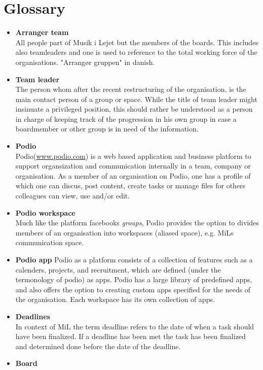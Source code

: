 \section{Glossary}
\begin{itemize}
	\item \textbf{Arranger team}\\
	All people part of Musik i Lejet but the members of the boards. This includes also teamleaders and one is used to reference to the total working force of the organisations. "Arrangør gruppen" in danish.
	\item \textbf{Team leader}\\
	The person whom after the recent restructuring of the organisation, is the main contact person of a group or space. While the title of team leader might insinuate a privileged position, this should rather be understood as a person in charge of keeping track of the progression in his own group in case a boardmember or other group is in need of the information.
	\item \textbf{Podio}\\
	Podio(\href{www.podio.com}{www.podio.com}) is a web based application and business platform to support organsization and communication internally in a team, company or organisation. As a member of an organisation on Podio, one has a profile of which one can discus, post content, create tasks or manage files for others colleagues can view, use and/or edit.
	\item \textbf{Podio workspace} \\
	Much like the platform facebooks \emph{groups}, Podio provides the option to divides members of an organisation into workspaces (aliased space), e.g. MiLs communication space.
	\item \textbf{Podio app}
	Podio as a platform consists of a collection of features such as a calenders, projects, and recruitment, which are defined (under the termonology of podio) as apps. Podio has a large library of predefined apps, and also offers the option to creating custom apps specified for the needs of the organisation. Each workspace has its own collection of apps.
	\item \textbf{Deadlines}\\
	In context of MiL the term deadline refers to the date of when a task should have been finalized. If a deadline has been met the task has been finalized and determined done before the date of the deadline.
	\item \textbf{Board}\\

\end{itemize}
